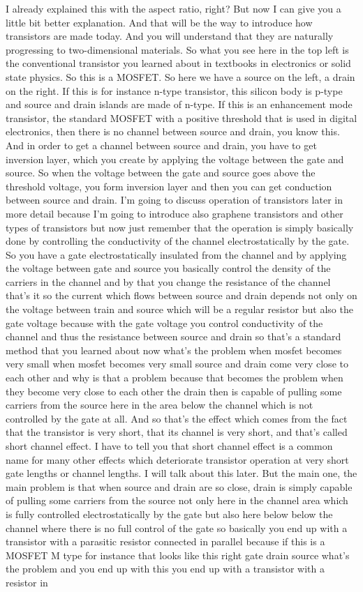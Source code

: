 I already explained this with the aspect ratio, right? But now I can give you a little bit better explanation. And that will be the way to introduce how transistors are made today. And you will understand that they are naturally progressing to two-dimensional materials. So what you see here in the top left is the conventional transistor you learned about in textbooks in electronics or solid state physics. So this is a MOSFET. So here we have a source on the left, a drain on the right. If this is for instance n-type transistor, this silicon body is p-type and source and drain islands are made of n-type. If this is an enhancement mode transistor, the standard MOSFET with a positive threshold that is used in digital electronics, then there is no channel between source and drain, you know this. And in order to get a channel between source and drain, you have to get inversion layer, which you create by applying the voltage between the gate and source. So when the voltage between the gate and source goes above the threshold voltage, you form inversion layer and then you can get conduction between source and drain. I'm going to discuss operation of transistors later in more detail because I'm going to introduce also graphene transistors and other types of transistors but now just remember that the operation is simply basically done by controlling the conductivity of the channel electrostatically by the gate. So you have a gate electrostatically insulated from the channel and by applying the voltage between gate and source you basically control the density of the carriers in the channel and by that you change the resistance of the channel that's it so the current which flows between source and drain depends not only on the voltage between train and source which will be a regular resistor but also the gate voltage because with the gate voltage you control conductivity of the channel and thus the resistance between source and drain so that's a standard method that you learned about now what's the problem when mosfet becomes very small when mosfet becomes very small source and drain come very close to each other and why is that a problem because that becomes the problem when they become very close to each other the drain then is capable of pulling some carriers from the source here in the area below the channel which is not controlled by the gate at all. And so that's the effect which comes from the fact that the transistor is very short, that its channel is very short, and that's called short channel effect. I have to tell you that short channel effect is a common name for many other effects which deteriorate transistor operation at very short gate lengths or channel lengths. I will talk about this later. But the main one, the main problem is that when source and drain are so close, drain is simply capable of pulling some carriers from the source not only here in the channel area which is fully controlled electrostatically by the gate but also here below below the channel where there is no full control of the gate so basically you end up with a transistor with a parasitic resistor connected in parallel because if this is a MOSFET M type for instance that looks like this right gate drain source what's the problem and you end up with this you end up with a transistor with a resistor in 